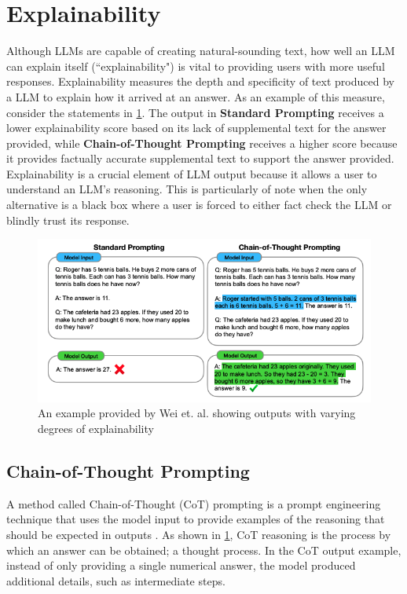 \documentclass[letterpaper,12pt]{article}
\begin{document}
\section{Explainability}

Although LLMs are capable of creating natural-sounding text, how well an LLM can explain itself (``explainability") is vital to providing users with more useful responses. Explainability measures the depth and specificity of text produced by a LLM to explain how it arrived at an answer. As an example of this measure, consider the statements in \cref{fig:CoT}. The output in \textbf{Standard Prompting} receives a lower explainability score based on its lack of supplemental text for the answer provided, while \textbf{Chain-of-Thought Prompting} receives a higher score because it provides factually accurate supplemental text to support the answer provided. Explainability is a crucial element of LLM output because it allows a user to understand an LLM's reasoning. This is particularly of note when the only alternative is a black box where a user is forced to either fact check the LLM or blindly trust its response.

\begin{figure}[htbp]
    \caption{An example provided by Wei et. al. showing outputs with varying degrees of explainability \cite{wei2022chain}}
    \label{fig:CoT}
    \includegraphics[width=12cm]{chain-of-thought}
    \centering
\end{figure}

\subsection{Chain-of-Thought Prompting}
\label{sec:cot}
A method called Chain-of-Thought (CoT) prompting is a prompt engineering technique that uses the model input to provide examples of the reasoning that should be expected in outputs \cite{wei2022chain}. As shown in \cref{fig:CoT}, CoT reasoning is the process by which an answer can be obtained; a thought process. In the CoT output example, instead of only providing a single numerical answer, the model produced additional details, such as intermediate steps.
\end{document}
